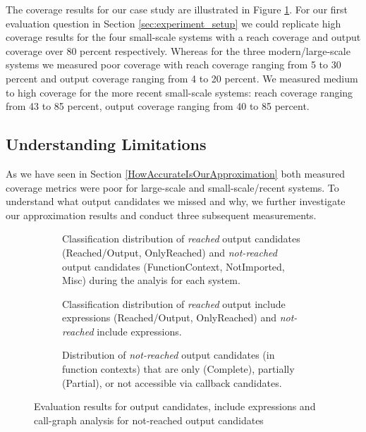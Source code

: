 \documentclass[sigconf]{acmart}
\begin{document}
The coverage results for our case study are illustrated in Figure
\ref{coverage}. For our first evaluation question in Section \ref{sec:experiment_setup} we
could replicate high coverage results for the four small-scale systems with a reach
coverage and output coverage over 80 percent respectively. Whereas for the
three modern/large-scale systems we measured poor coverage with reach coverage
ranging from 5 to 30 percent and output coverage ranging from 4 to 20 percent.
We measured medium to high coverage for the more recent small-scale systems:
reach coverage ranging from 43 to 85 percent, output coverage ranging from 40
to 85 percent.

\subsection{Understanding Limitations} \label{sec:understanding_limitations}
As we have seen in Section \ref{HowAccurateIsOurApproximation} both measured
coverage metrics were poor for large-scale and small-scale/recent systems. To
understand what output candidates we missed and why, we further investigate
our approximation results and conduct three subsequent measurements.

\begin{figure}[h!]
	\begin{subfigure}[center]{0.48\textwidth}
		
		\caption{
		Classification distribution of \emph{reached} output candidates
		(Reached/Output, OnlyReached) and \emph{not-reached} output candidates
		(FunctionContext, NotImported, Misc) during the analyis for each system.
		\label{coverage}}
	\end{subfigure}
	\vspace{1mm}
	
	\begin{subfigure}[center]{0.48\textwidth}
		
		\caption{
			Classification distribution of \emph{reached} output include expressions
			(Reached/Output, OnlyReached) and \emph{not-reached} include expressions.
			\label{fig:include_coverage_results}
		}
	\end{subfigure}
	\vspace{1mm}
	
	\begin{subfigure}[center]{0.48\textwidth}
		
		\caption{
			Distribution of \emph{not-reached} output candidates (in function contexts)
			that are only (Complete), partially (Partial), or not accessible via callback candidates. 
			\label{fig:output_candidate_explanation}
		}
		
	\end{subfigure}
	\caption{Evaluation results for output candidates, include expressions and
	call-graph analysis for not-reached output candidates}
\end{figure}
\end{document}
